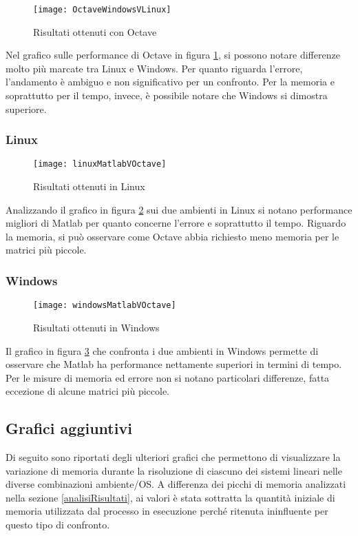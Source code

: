 \begin{figure}[H]
\texttt{[image: OctaveWindowsVLinux]}\centering
\caption{Risultati ottenuti con Octave}\label{fig:octave}
\end{figure}
Nel grafico sulle performance di Octave in figura \ref{fig:octave}, si possono notare differenze molto più marcate tra Linux e Windows. Per quanto riguarda l'errore, l'andamento è ambiguo e non significativo per un confronto. Per la memoria e soprattutto per il tempo, invece, è possibile notare che Windows si dimostra superiore.

\subsubsection{Linux}
\begin{figure}[H]
\texttt{[image: linuxMatlabVOctave]}\centering
\caption{Risultati ottenuti in Linux}\label{fig:linux}
\end{figure}
Analizzando il grafico in figura \ref{fig:linux} sui due ambienti in Linux si notano performance migliori di Matlab per quanto concerne l'errore e soprattutto il tempo. Riguardo la memoria, si può osservare come Octave abbia richiesto meno memoria per le matrici più piccole.

\subsubsection{Windows}
\begin{figure}[H]
\texttt{[image: windowsMatlabVOctave]}\centering
\caption{Risultati ottenuti in Windows}\label{fig:windows}
\end{figure}

Il grafico in figura \ref{fig:windows} che confronta i due ambienti in Windows permette di osservare che Matlab ha performance nettamente superiori in termini di tempo. Per le misure di memoria ed errore non si notano particolari differenze, fatta eccezione di alcune matrici più piccole.

\subsection{Grafici aggiuntivi}\label{graficiMemoria}
Di seguito sono riportati degli ulteriori grafici che permettono di visualizzare la variazione
di memoria durante la risoluzione di ciascuno dei sistemi lineari nelle diverse combinazioni ambiente/OS. A differenza dei picchi di memoria analizzati nella sezione \ref{analisiRisultati}, ai valori è stata sottratta la quantità iniziale di memoria utilizzata dal processo in esecuzione perché ritenuta ininfluente per questo tipo di confronto. \\


